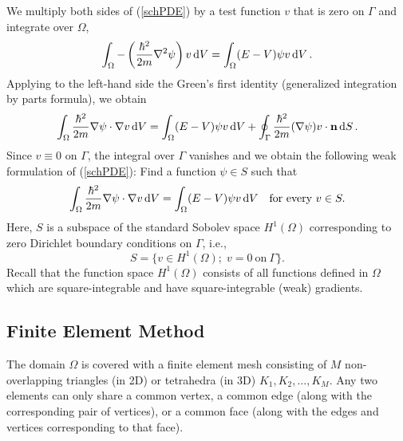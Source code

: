 We multiply both sides of (\ref{schPDE}) by a test function $v$
that is zero on $\Gamma$ and integrate over $\Omega$,
\begin{equation}
  \int_{\Omega}-\left({\hbar^2\over2m}\nabla^2\psi\right)v\,{\rm d} V=\int_{\Omega}(E-V)\psi
v\,{\rm d} V\,.  \label{1}
\end{equation}
Applying to the left-hand side 
the Green's first identity (generalized integration by parts formula), 
we obtain 
$$
  \int_{\Omega}{\hbar^2\over2m}\nabla\psi\cdot\nabla v\,{\rm d} V=\int_{\Omega}(E-V)\psi
v\,{\rm d} V+\oint_{\Gamma}{\hbar^2\over2m}(\nabla \psi)v\cdot{\bf n}\,{\rm d} S\,.
$$
Since $v \equiv 0$ on $\Gamma$, the integral over $\Gamma$ vanishes and 
we obtain the following weak formulation of (\ref{schPDE}):
\def\S{S}
Find a function $\psi\in\S$ such that 
\begin{equation}\label{w}
  \int_{\Omega}{\hbar^2\over2m}\nabla\psi\cdot\nabla v\,\d V=\int_{\Omega}(E-V)\psi
v\,\d V\ \ \ \mbox{for every} \ v \in \S.
\end{equation}
Here, $\S$ is a subspace of the standard Sobolev space $H^1(\Omega)$ 
corresponding to zero Dirichlet boundary conditions on $\Gamma$, i.e.,
$$
\S = \{v \in H^1(\Omega); \; v = 0 \ \mbox{on} \ \Gamma   \}.
$$
Recall that the function space $H^1(\Omega)$ consists of all functions defined in $\Omega$
which are square-integrable and have square-integrable (weak) gradients.

\subsection{Finite Element Method}

The domain $\Omega$ is covered with a finite element mesh consisting of $M$ 
non-overlapping triangles (in 2D) or tetrahedra (in 3D) $K_1, K_2, \ldots, K_M$. 
Any two elements can only share a common vertex, a common edge (along with the corresponding pair of 
vertices), or a common face (along with the edges and vertices corresponding to that face).

